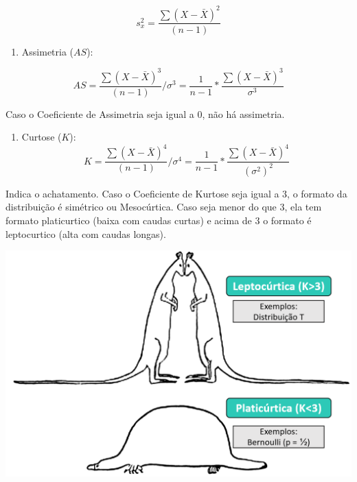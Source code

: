 \documentclass[
]{book}
\providecommand{\tightlist}{%
  \setlength{\itemsep}{0pt}\setlength{\parskip}{0pt}}
\begin{document}
\[s^{2}_{x}=\frac{\sum (X-\bar{X})^{2}}{(n-1)}\]

\begin{enumerate}
\def\labelenumi{\arabic{enumi}.}
\setcounter{enumi}{2}
\tightlist
\item
  Assimetria (\(AS\)):
\end{enumerate}

\[AS = \frac{\sum (X-\bar{X})^{3}}{(n-1)}/\sigma^3 = \frac{1}{n-1} *\frac{\sum (X-\bar{X})^3}{\sigma^3}\]

Caso o Coeficiente de Assimetria seja igual a 0, não há assimetria.

\begin{enumerate}
\def\labelenumi{\arabic{enumi}.}
\setcounter{enumi}{3}
\tightlist
\item
  Curtose (\(K\)):\\
  \[K = \frac{\sum (X-\bar{X})^{4}}{(n-1)}/\sigma^4= \frac{1}{n-1} *\frac{\sum (X-\bar{X})^4}{({\sigma^2})^2}\]
\end{enumerate}

Indica o achatamento. Caso o Coeficiente de Kurtose seja igual a 3, o
formato da distribuição é simétrico ou Mesocúrtica. Caso seja menor do
que 3, ela tem formato platicurtico (baixa com caudas curtas) e acima de
3 o formato é leptocurtico (alta com caudas longas).

\includegraphics{./img/cap_desc_curtose.png}
\end{document}
